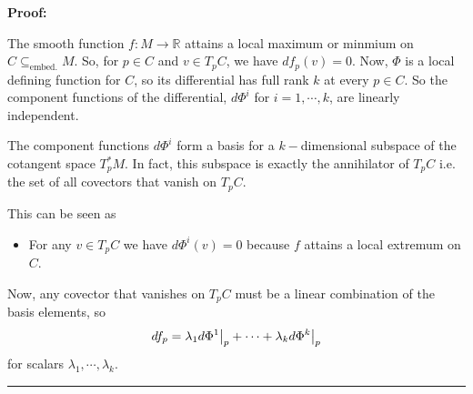 \documentclass{article}
\newcommand{\R}{\mathbb{R}}
\newcommand{\restr}[2]{{%
  \left.\kern-\nulldelimiterspace %
  #1 %
  \vphantom{\big|} %
  \right|_{#2} %
  }}
\begin{document}
\vskip 0.5cm
\textbf{Proof:}




\vskip 0.25cm
The smooth function $f : M \rightarrow \R$ attains a local maximum or minmium on $C \subseteq_{\text{embed.}} M$. So, for $p \in C$ and $v \in T_p C$, we have $df_p(v) = 0$. Now, $\Phi$ is a local defining function for $C$, so its differential has full rank $k$ at every $p \in C$. So the component functions of the differential, $d\Phi^i$ for $i = 1,\cdots,k$, are linearly independent.

\vskip 0.25cm
The component functions $d\Phi^i$ form a basis for a $k-$dimensional subspace of the cotangent space $T_p^*M$. In fact, this subspace is exactly the annihilator of $T_p C$ i.e. the set of all covectors that vanish on $T_p C$. 

\begin{dottedbox}
  This can be seen as 
  \begin{itemize}
    \item For any $v \in T_p C$ we have $d\Phi^i(v) = 0$ because $f$ attains a local extremum on $C$. 
  \end{itemize}
\end{dottedbox}

Now, any covector that vanishes on $T_p C$ must be a linear combination of the basis elements, so 
\[ df_p = \lambda_1 \restr{d\Phi^1}{p} + \cdots + \lambda_k \restr{d\Phi^k}{p} \] for scalars $\lambda_1, \cdots, \lambda_k$.

\vskip 0.5cm
\hrule 
\vskip 0.5cm






\end{document}
